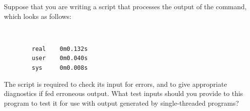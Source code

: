 \QuickQ{}
	Suppose that you are writing a script that processes the
	output of the  command, which looks as follows:

	\vspace{5pt}
	\begin{minipage}[t]{\columnwidth}
	\tt
	\scriptsize
	\begin{verbatim}
		real    0m0.132s
		user    0m0.040s
		sys     0m0.008s
	\end{verbatim}
	\end{minipage}
	\vspace{5pt}

	The script is required to check its input for errors, and to
	give appropriate diagnostics if fed erroneous  output.
	What test inputs should you provide to this program to test it
	for use with  output generated by single-threaded programs?
\QuickA{}
